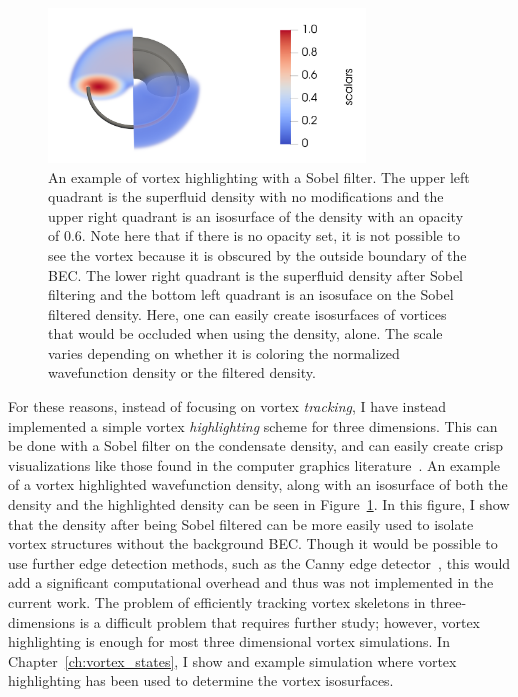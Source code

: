 \begin{figure}
\center \includegraphics[width=0.75\textwidth]{data/gpu/vortex_highlighting/all.png}
\caption{
An example of vortex highlighting with a Sobel filter.
The upper left quadrant is the superfluid density with no modifications and the upper right quadrant is an isosurface of the density with an opacity of 0.6.
Note here that if there is no opacity set, it is not possible to see the vortex because it is obscured by the outside boundary of the BEC.
The lower right quadrant is the superfluid density after Sobel filtering and the bottom left quadrant is an isosuface on the Sobel filtered density.
Here, one can easily create isosurfaces of vortices that would be occluded when using the density, alone.
The scale varies depending on whether it is coloring the normalized wavefunction density or the filtered density.
}
\label{fig:highlight}
\end{figure}

For these reasons, instead of focusing on vortex \textit{tracking}, I have instead implemented a simple vortex \textit{highlighting} scheme for three dimensions.
This can be done with a Sobel filter on the condensate density, and can easily create crisp visualizations like those found in the computer graphics literature~\cite{guo2018}.
An example of a vortex highlighted wavefunction density, along with an isosurface of both the density and the highlighted density can be seen in Figure~\ref{fig:highlight}.
In this figure, I show that the density after being Sobel filtered can be more easily used to isolate vortex structures without the background BEC.
Though it would be possible to use further edge detection methods, such as the Canny edge detector~\cite{canny1986}, this would add a significant computational overhead and thus was not implemented in the current work.
The problem of efficiently tracking vortex skeletons in three-dimensions is a difficult problem that requires further study; however, vortex highlighting is enough for most three dimensional vortex simulations.
In Chapter~\ref{ch:vortex_states}, I show and example simulation where vortex highlighting has been used to determine the vortex isosurfaces.

